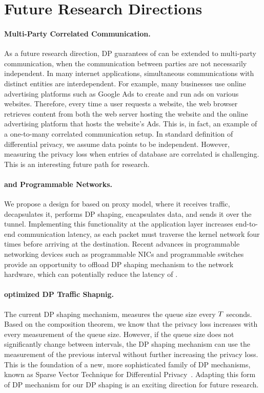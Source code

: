 \section{Future Research Directions}\label{sec:conclusion-future}
\paragraph{Multi-Party Correlated Communication.}
As a future research direction, DP guarantees of {\sys} can be extended to multi-party communication, when the communication between parties are not necessarily independent.
In many internet applications,  simultaneous communications with distinct entities are interdependent.
For example, many businesses use online advertising platforms such as Google Ads to create and run ads on various websites.
Therefore, every time a user requests a website, the web browser retrieves content from both the web server hosting the website and the online advertising platform that hosts the website's Ads.   
This is, in fact, an example of a one-to-many correlated communication setup.
In standard definition of differential privacy, we assume data points to be independent.  
However, measuring the privacy loss when entries of database are correlated is challenging. 
This is an interesting future path for research.

\paragraph{{\sys} and Programmable Networks.}
We propose a design for {\sys} based on proxy model, where it receives traffic, decapsulates it, performs DP shaping, encapsulates data, and sends it over the tunnel.
Implementing this functionality at the application layer increases end-to-end communication latency, as each packet must traverse the kernel network four times before arriving at the destination.
Recent advances in programmable networking devices such as programmable NICs and programmable switches~\cite{meier2022ditto} provide an opportunity to offload DP shaping mechanism to the network hardware, which can potentially reduce the latency of {\sys}.

\paragraph{optimized DP Traffic Shapnig.}
The current DP shaping mechanism, measures the queue size every $T$ seconds.
Based on the composition theorem, we know that the privacy loss increases with every measurement of the queue size. 
However, if the queue size does not significantly change between intervals, the DP shaping mechanism can use the measurement of the previous interval without further increasing the privacy loss. 
This is the foundation of a new, more sophisticated family of DP mechanisms, known as Sparse Vector Technique for Differential Privacy~\cite{lyu2016understanding}. 
Adapting this form of DP mechanism for our DP shaping is an exciting direction for future research.
